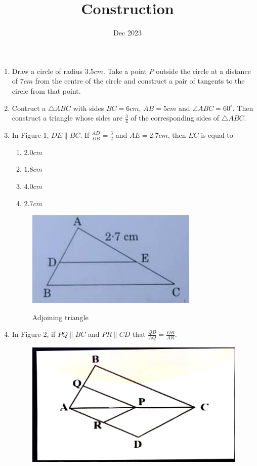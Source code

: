 \documentclass[12pt,-letter paper]{article}
\title{Construction}
\date{Dec 2023}
\begin{document}
\maketitle
\begin{enumerate}
\item Draw a circle of radius $3.5 cm$. Take a point $P$ outside the circle at a distance of $7 cm$ from the centre of the circle and construct a pair of tangents to the circle from that point.

\item Contruct a $\triangle ABC $ with sides $BC = 6 cm$, $AB = 5 cm$ and $\angle ABC = 60^{\circ}$. Then construct a triangle whose sides are $\frac{3}{4}$ of the corresponding sides of $\triangle ABC$.

\item In Figure-1, $DE \parallel BC $. If $\frac{AD}{DB}=\frac{3}{2}$ and $AE = 2.7 cm$, then $EC$ is equal to
\begin{enumerate}
		\item $2.0 cm$ 
                \item $1.8 cm$ 
                \item $4.0 cm$
                \item $2.7 cm$
\end{enumerate}
	\begin{figure}[H]
		\centering
		\includegraphics[width=\columnwidth]{figs/Construction-1.jpg}
		\label{fig:Construction-1.jpg}
		\caption{Adjoining triangle}
	\end{figure}
\newpage
\item In Figure-2, if $PQ \parallel BC$ and $PR \parallel CD$ that $\frac{QB}{AQ} = \frac{DR}{AR}$.
	\begin{figure}[H]
		\centering
		\includegraphics[width=\columnwidth]{figs/Construction-2.jpg}

\end{figure}
\end{enumerate}
\end{document}

